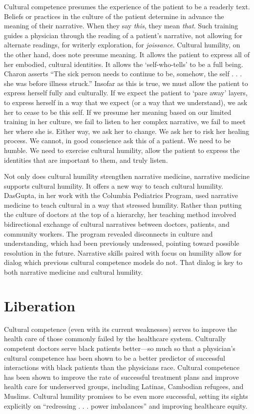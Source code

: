 \documentclass[12pt]{article}
\begin{document}
Cultural competence presumes the experience of the patient to be a readerly
text. Beliefs or practices in the culture of the patient determine in advance
the meaning of their narrative. When they say \emph{this}, they mean
\emph{that}.  Such training guides a physician through the reading of a
patient's narrative, not allowing for alternate readings, for writerly
exploration, for \emph{joissance}. Cultural humility, on the other hand, does
note presume meaning. It allows the patient to express all of her embodied, 
cultural identities. It allows the `self-who-tells' to be a full being.  Charon
asserts ``The sick person needs to continue to be, somehow, the self . .  . she
was before illness struck.''\autocite[p.~21]{Charon06} Insofar as this is true,
we must allow the patient to express herself fully and culturally. If we expect
the patient to `pare away' layers, to express herself in a way that we expect
(or a way that we understand), we ask her to cease to be this self. If we
presume her meaning based on our limited training in her culture, we fail to
listen to her complex narrative, we fail to meet her where she is. Either way,
we ask her to change. We ask her to risk her healing process. We cannot, in
good conscience ask this of a patient.  We need to be humble. We need to
exercise cultural humility, allow the patient to express the identities that
are important to them, and truly listen.

Not only does cultural humility strengthen narrative medicine, narrative
medicine supports cultural humility. It offers a new way to teach cultural
humility. DasGupta, in her work with the Columbia Pediatrics Program, used
narrative medicine to teach cultural  in a way that stressed
humility.\autocite{DasGupta06} Rather than putting the culture of doctors at
the top of a hierarchy, her teaching method involved bidirectional exchange of
cultural narratives between doctors, patients, and community workers. The
program revealed disconnects in culture and understanding, which had been
previously undressed, pointing toward possible resolution in the future.
Narrative skills paired with focus on humility allow for dialog which previous
cultural competence models do not. That dialog is key to both narrative
medicine and cultural humility.


\section{Liberation}

Cultural competence (even with its current weaknesses) serves to improve the
health care of those commonly failed by the healthcare system. Culturally
competent doctors serve black patients better---so much so that a physician's
cultural competence has been shown to be a better predictor of successful
interactions with black patients than the physicians
race.\autocite{Michalopoulou09} Cultural competence has been shown to improve
the rate of successful treatment plans and improve health care for underserved
groups, including Latinas, Cambodian refugees, and Muslims.\autocite{Padela08}
Cultural humility promises to be even more successful, setting its sights
explicitly on ``redressing . . . power imbalances''\autocite{Tervalon98} and
improving healthcare equity.
\end{document}
